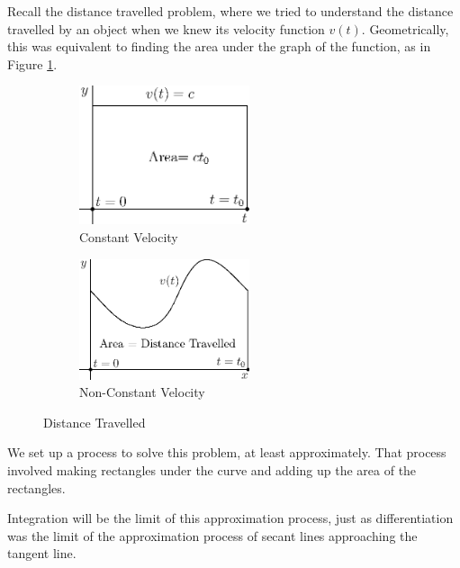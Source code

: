 \documentclass[fleqn]{report}
\begin{document}
Recall the distance travelled problem, where we tried to
understand the distance travelled by an object when we knew
its velocity function $v(t)$. Geometrically, this was
equivalent to finding the area under the graph of the
function, as in Figure \ref{figure-distance-travelled2}.

\begin{figure}[ht]
\centering
\begin{subfigure}{.5\textwidth}
 \centering
 \includegraphics[width=5cm]{figure14.eps}
 \caption{Constant Velocity}
\end{subfigure}%
\begin{subfigure}{.5\textwidth}
 \centering
 \includegraphics[width=5cm]{figure15.eps}
 \caption{Non-Constant Velocity}
\end{subfigure}
\caption{Distance Travelled}
\label{figure-distance-travelled2}
\end{figure}

We set up a process to solve this problem, at
least approximately. That process involved making rectangles
under the curve and adding up the area of the rectangles.

Integration will be the limit of this approximation process,
just as differentiation was the limit of the approximation
process of secant lines approaching the tangent line. 
\end{document}
